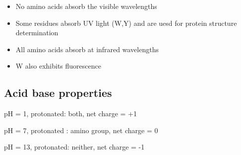 \documentclass[letterpaper, 12pt]{article}
\begin{document}
\begin{itemize}
\item No amino acids absorb the visible wavelengths
\item Some residues absorb UV light (W,Y) and are uesd for protein structure determination
\item All amino acids absorb at infrared wavelengths
\item W also exhibits fluorescence
\end{itemize}

\subsection*{Acid base properties}

pH = 1, protonated: both, net charge = +1

pH = 7, protonated : amino group, net charge = 0

pH = 13, protonated: neither, net charge = -1
\end{document}
